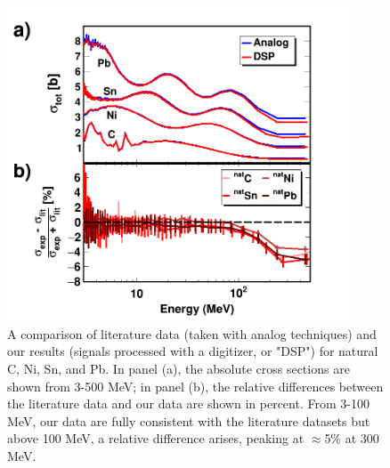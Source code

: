 \begin{figure}[ht!]
    \centering
    \includegraphics[width=0.9\textwidth]{figures/literatureBenchmarking.png}
    \caption[Comparison of our natural-sample \tot\ measurement against literature data]
    {
        A comparison of literature data (taken with analog
        techniques) and our results (signals processed with a digitizer, or "DSP")
        for natural C, Ni, Sn, and Pb. In panel (a), the absolute cross sections are shown from
        3-500 MeV; in panel (b), the relative differences between the literature data and
        our data are shown in percent. From 3-100 MeV, our data are fully consistent with the
        literature datasets but above 100 MeV, a relative difference arises, peaking at
        $\approx$5\% at 300 MeV.
    }
    \label{LiteratureBenchmarking}
\end{figure}


